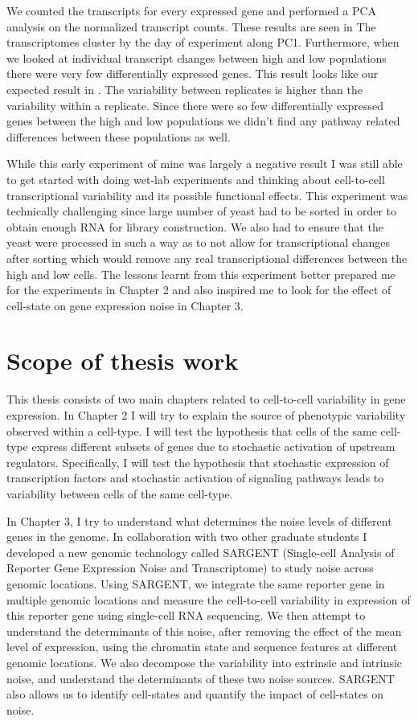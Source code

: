 We counted the transcripts for every expressed gene and performed a PCA analysis on the normalized transcript counts. These results are seen in  The transcriptomes cluster by the day of experiment along PC1. Furthermore, when we looked at individual transcript changes between high and low populations there were very few differentially expressed genes. This result looks like our expected result in . The variability between replicates is higher than the variability within a replicate. Since there were so few differentially expressed genes between the high and low populations we didn't find any pathway related differences between these populations as well.

While this early experiment of mine was largely a negative result I was still able to get started with doing wet-lab experiments and thinking about cell-to-cell transcriptional variability and its possible functional effects. This experiment was technically challenging since large number of yeast had to be sorted in order to obtain enough RNA for library construction. We also had to ensure that the yeast were processed in such a way as to not allow for transcriptional changes after sorting which would remove any real transcriptional differences between the high and low cells. The lessons learnt from this experiment better prepared me for the experiments in Chapter 2 and also inspired me to look for the effect of cell-state on gene expression noise in Chapter 3.

\section{Scope of thesis work}

This thesis consists of two main chapters related to cell-to-cell variability in gene expression. In  Chapter 2 I will try to explain the source of phenotypic variability observed within a cell-type. I will test the hypothesis that cells of the same cell-type express different subsets of genes due to stochastic activation of upstream regulators. Specifically, I will test the hypothesis that stochastic expression of transcription factors and stochastic activation of signaling pathways leads to variability between cells of the same cell-type.

In Chapter 3, I try to understand what determines the noise levels of different genes in the genome. In collaboration with two other graduate students I developed a new genomic technology called SARGENT (Single-cell Analysis of Reporter Gene Expression Noise and Transcriptome) to study noise across genomic locations. Using SARGENT, we integrate the same reporter gene in multiple genomic locations and measure the cell-to-cell variability in expression of this reporter gene using single-cell RNA sequencing. We then attempt to understand the determinants of this noise, after removing the effect of the mean level of expression, using the chromatin state and sequence features at different genomic locations. We also decompose the variability into extrinsic and intrinsic noise, and understand the determinants of these two noise sources. SARGENT also allows us to identify cell-states and quantify the impact of cell-states on noise.

